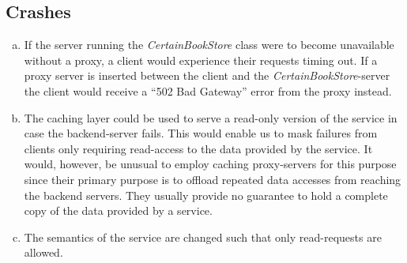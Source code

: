 \documentclass[11pt,a4paper,english]{article}
\begin{document}
\subsection{Crashes}

\begin{enumerate}[(a)]
\item If the server running the \textit{CertainBookStore} class were to become
  unavailable without a proxy, a client would experience their requests timing
  out. If a proxy server is inserted between the client and the
  \textit{CertainBookStore}-server the client would receive a ``502 Bad
  Gateway'' error from the proxy instead.
\item The caching layer could be used to serve a read-only version of the
  service in case the backend-server fails. This would enable us to mask
  failures from clients only requiring read-access to the data provided by the
  service. It would, however, be unusual to employ caching proxy-servers for
  this purpose since their primary purpose is to offload repeated data accesses
  from reaching the backend servers. They usually provide no guarantee to hold a
  complete copy of the data provided by a service.
\item The semantics of the service are changed such that only read-requests are
  allowed. 
\end{enumerate}


%
%



\end{document}
